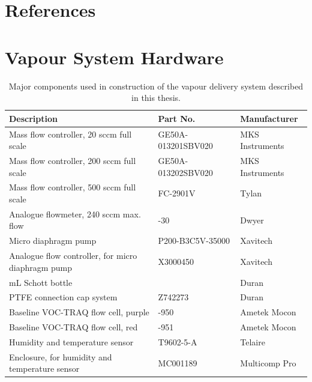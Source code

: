 \documentclass[
  a4paper,
]{scrbook}
\begin{document}

\hypertarget{references}{%
\chapter*{References}\label{references}}


\printbibliography[heading=none]

\cleardoublepage
{}
{}
\appendix

\hypertarget{vapour-system-hardware}{%
\chapter{Vapour System Hardware}\label{vapour-system-hardware}}


\hypertarget{tbl-vapour-sensor-components}{}
\begin{longtable}[t]{>{\raggedright\arraybackslash}p{5.5cm}>{\raggedright\arraybackslash}p{4.5cm}>{\raggedright\arraybackslash}p{3.75cm}}
\caption{\label{tbl-vapour-sensor-components}Major components used in construction of the vapour delivery system
described in this thesis. }\tabularnewline

\toprule
Description & Part No. & Manufacturer\\
\midrule
Mass flow controller, 20 sccm full scale & GE50A-013201SBV020 & MKS Instruments\\
Mass flow controller, 200 sccm full scale & GE50A-013202SBV020 & MKS Instruments\\
Mass flow controller, 500 sccm full scale & FC-2901V & Tylan\\
Analogue flowmeter, 240 sccm max. flow & 116261-30 & Dwyer\\
Micro diaphragm pump & P200-B3C5V-35000 & Xavitech\\
\addlinespace
Analogue flow controller, for micro diaphragm pump & X3000450 & Xavitech\\
10 mL Schott bottle & 218010802 & Duran\\
PTFE connection cap system & Z742273 & Duran\\
Baseline VOC-TRAQ flow cell, purple & 043-950 & Ametek Mocon\\
Baseline VOC-TRAQ flow cell, red & 043-951 & Ametek Mocon\\
\addlinespace
Humidity and temperature sensor & T9602-5-A & Telaire\\
Enclosure, for humidity and temperature sensor & MC001189 & Multicomp Pro\\
\bottomrule
\end{longtable}
\end{document}
